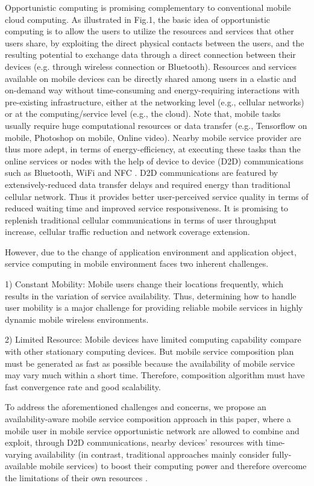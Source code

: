 \documentclass[10pt,journal,compsoc]{IEEEtran}
\begin{document}
Opportunistic computing is promising complementary to conventional mobile cloud computing. As illustrated in Fig.1, the basic idea of opportunistic computing is to allow the users to utilize the resources and services that other users share, by exploiting the direct physical contacts between the users, and the resulting potential to exchange data through a direct connection between their devices (e.g. through wireless connection or Bluetooth). Resources and services available on mobile devices can be directly shared among users in a elastic and on-demand way without time-consuming and energy-requiring interactions with pre-existing infrastructure, either at the networking level (e.g., cellular networks) or at the computing/service level (e.g., the cloud). 
Note that, mobile tasks usually require huge computational resources or data transfer (e.g., Tensorflow on mobile, Photoshop on mobile, Online video). Nearby mobile service provider are thus more adept, in terms of energy-efficiency, at executing these tasks than the online services or nodes with the help of device
to device (D2D) communications such as Bluetooth, WiFi and NFC \cite{balani2007energy}. D2D communications are featured by extensively-reduced data transfer delays and required energy than traditional cellular network. Thus it provides better user-perceived service quality in terms of reduced waiting time and improved service responsiveness. It is promising to replenish traditional cellular communications in terms of user throughput increase, cellular traffic reduction and network coverage extension. 

However, due to the change of application environment and application object, service computing in mobile environment faces two inherent challenges.

1) Constant Mobility: Mobile users change their locations frequently, which results in the variation of service availability. Thus, determining how to handle user mobility is a major challenge for providing reliable mobile services in highly dynamic mobile wireless environments.

2) Limited Resource: Mobile devices have limited computing capability compare with other stationary computing devices. But mobile service composition plan must be generated as fast as possible because the availability of mobile service may vary much within a short time. Therefore, composition algorithm must have fast convergence rate and good scalability.

To address the aforementioned challenges and concerns, we propose an availability-aware mobile service composition approach in this paper, where a mobile user in mobile service opportunistic network are allowed to combine and exploit, through D2D communications, nearby devices' resources with time-varying availability (in contrast, traditional approaches mainly consider fully-available mobile services) to boost their computing power and therefore overcome the limitations of their own resources \cite{giordano2011human}. 
\end{document}

